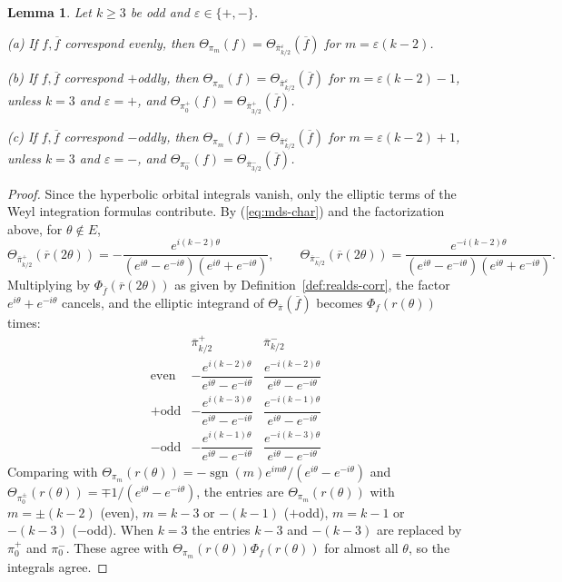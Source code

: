 \documentclass[12pt,letterpaper,openany]{book}
\theoremstyle{plain}
\newtheorem{lemma}[theorem]{Lemma}
\theoremstyle{definition}
\theoremstyle{remark}
\theoremstyle{remark}
\DeclareMathOperator{\sgn}{sgn}
\begin{document}
\begin{lemma}\label{lem:realds}
Let $k\geq3$ be odd and $\varepsilon\in\{+,-\}$.

(a) If $f,\overline{f}$ correspond evenly, then
$\Theta _{\pi _m}(f)
=\Theta _{\overline{\pi }{}_{k/2}^\varepsilon }(\overline{f})$ for
$m=\varepsilon (k-2)$.

(b) If $f,\overline{f}$ correspond $+$oddly, then
$\Theta _{\pi _m}(f)
=\Theta _{\overline{\pi }{}_{k/2}^\varepsilon }(\overline{f})$ for
$m=\varepsilon (k-2)-1$, unless $k=3$ and
$\varepsilon =+$, and
$\Theta _{\pi _{0}^{+}}(f)=\Theta _{\overline{\pi }{}_{3/2}^{+}}(\overline{f})$.

(c) If $f,\overline{f}$ correspond $-$oddly, then
$\Theta _{\pi _m}(f)
=\Theta _{\overline{\pi }{}_{k/2}^\varepsilon }(\overline{f})$ for
$m=\varepsilon (k-2)+1$, unless $k=3$ and
$\varepsilon =-$, and
$\Theta _{\pi _{0}^{-}}(f)=\Theta _{\overline{\pi }{}_{3/2}^{-}}(\overline{f})$.
\end{lemma}

\begin{proof}
Since the hyperbolic orbital integrals vanish, only the elliptic terms
of the Weyl integration formulas contribute. By (\ref{eq:mds-char}) and
the factorization above, for $\theta\notin E$,
\[
\Theta_{\overline{\pi}{}^{+}_{k/2}}(\overline r(2\theta))
=-\frac{e^{i(k-2)\theta}}{(e^{i\theta}-e^{-i\theta})(e^{i\theta}+e^{-i\theta})},
\qquad
\Theta_{\overline{\pi}{}^{-}_{k/2}}(\overline r(2\theta))
=\frac{e^{-i(k-2)\theta}}{(e^{i\theta}-e^{-i\theta})(e^{i\theta}+e^{-i\theta})}.
\]
Multiplying by $\Phi_{\overline f}(\overline r(2\theta))$ as given by
Definition~\ref{def:realds-corr}, the factor $e^{i\theta}+e^{-i\theta}$
cancels, and the elliptic integrand of $\Theta_{\overline\pi}(\overline f)$
becomes $\Phi_f(r(\theta))$ times:
\[
\renewcommand{\arraystretch}{1.6}
\begin{array}{c|cc}
 & \overline{\pi}{}^{+}_{k/2} & \overline{\pi}{}^{-}_{k/2}\\ \hline
\text{even} & -\dfrac{e^{i(k-2)\theta}}{e^{i\theta}-e^{-i\theta}}
 & \dfrac{e^{-i(k-2)\theta}}{e^{i\theta}-e^{-i\theta}}\\
+\text{odd} & -\dfrac{e^{i(k-3)\theta}}{e^{i\theta}-e^{-i\theta}}
 & \dfrac{e^{-i(k-1)\theta}}{e^{i\theta}-e^{-i\theta}}\\
-\text{odd} & -\dfrac{e^{i(k-1)\theta}}{e^{i\theta}-e^{-i\theta}}
 & \dfrac{e^{-i(k-3)\theta}}{e^{i\theta}-e^{-i\theta}}
\end{array}
\]
Comparing with
$\Theta_{\pi_m}(r(\theta))=-\sgn(m)e^{im\theta}/(e^{i\theta}-e^{-i\theta})$
and $\Theta_{\pi_0^{\pm}}(r(\theta))=\mp1/(e^{i\theta}-e^{-i\theta})$, the
entries are $\Theta_{\pi_m}(r(\theta))$ with $m=\pm(k-2)$ (even),
$m=k-3$ or $-(k-1)$ ($+$odd), $m=k-1$ or $-(k-3)$ ($-$odd). When $k=3$
the entries $k-3$ and $-(k-3)$ are replaced by $\pi_0^+$ and $\pi_0^-$.
These agree with $\Theta_{\pi_m}(r(\theta))\Phi_f(r(\theta))$ for almost
all $\theta$, so the integrals agree.
\end{proof}
\end{document}
